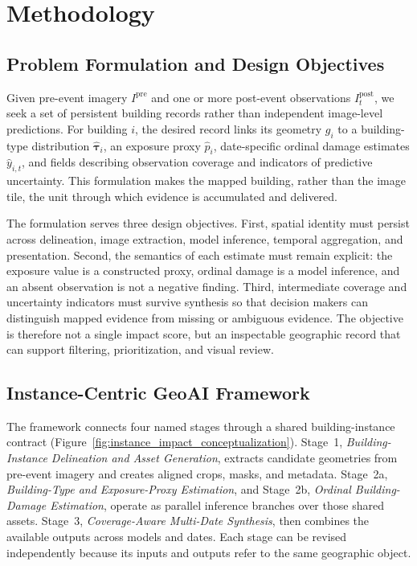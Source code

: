 \section{Methodology}
\label{sec:method}

\subsection{Problem Formulation and Design Objectives}
\label{sec:method_design}

Given pre-event imagery $I^{\mathrm{pre}}$ and one or more post-event observations $I_t^{\mathrm{post}}$, we seek a set of persistent building records rather than independent image-level predictions. For building $i$, the desired record links its geometry $g_i$ to a building-type distribution $\widehat{\boldsymbol{\tau}}_i$, an exposure proxy $\widehat{p}_i$, date-specific ordinal damage estimates $\widehat{y}_{i,t}$, and fields describing observation coverage and indicators of predictive uncertainty. This formulation makes the mapped building, rather than the image tile, the unit through which evidence is accumulated and delivered.

The formulation serves three design objectives. First, spatial identity must persist across delineation, image extraction, model inference, temporal aggregation, and presentation. Second, the semantics of each estimate must remain explicit: the exposure value is a constructed proxy, ordinal damage is a model inference, and an absent observation is not a negative finding. Third, intermediate coverage and uncertainty indicators must survive synthesis so that decision makers can distinguish mapped evidence from missing or ambiguous evidence. The objective is therefore not a single impact score, but an inspectable geographic record that can support filtering, prioritization, and visual review.

\subsection{Instance-Centric GeoAI Framework}
\label{sec:method_framework}

The framework connects four named stages through a shared building-instance contract (Figure~\ref{fig:instance_impact_conceptualization}). Stage~1, \emph{Building-Instance Delineation and Asset Generation}, extracts candidate geometries from pre-event imagery and creates aligned crops, masks, and metadata. Stage~2a, \emph{Building-Type and Exposure-Proxy Estimation}, and Stage~2b, \emph{Ordinal Building-Damage Estimation}, operate as parallel inference branches over those shared assets. Stage~3, \emph{Coverage-Aware Multi-Date Synthesis}, then combines the available outputs across models and dates. Each stage can be revised independently because its inputs and outputs refer to the same geographic object.

